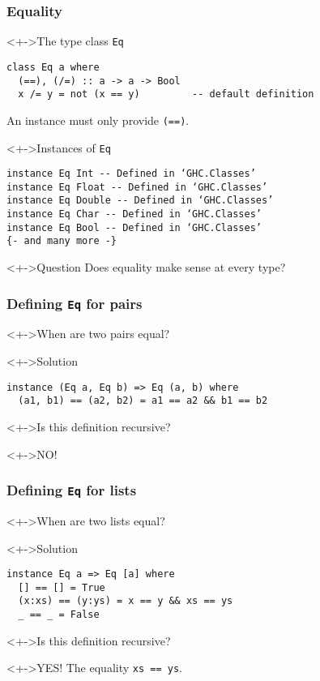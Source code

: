 \documentclass{beamer}
\begin{document}
\begin{frame}[fragile]
  \frametitle{Equality}
  \begin{block}<+->{The type class \texttt{Eq}}
\begin{verbatim}
class Eq a where
  (==), (/=) :: a -> a -> Bool
  x /= y = not (x == y)         -- default definition
\end{verbatim}
    An instance must only provide \texttt{(==)}.
  \end{block}
  \begin{block}<+->{Instances of \texttt{Eq}}
\begin{verbatim}
instance Eq Int -- Defined in ‘GHC.Classes’
instance Eq Float -- Defined in ‘GHC.Classes’
instance Eq Double -- Defined in ‘GHC.Classes’
instance Eq Char -- Defined in ‘GHC.Classes’
instance Eq Bool -- Defined in ‘GHC.Classes’
{- and many more -}
\end{verbatim}
  \end{block}
  \begin{alertblock}<+->{Question}
    Does equality make sense at every type?
  \end{alertblock}
\end{frame}
\begin{frame}[fragile]
  \frametitle{Defining \texttt{Eq} for pairs}
  \begin{block}<+->{When are two pairs equal?}
  \end{block}
  \begin{block}<+->{Solution}
\begin{verbatim}
instance (Eq a, Eq b) => Eq (a, b) where
  (a1, b1) == (a2, b2) = a1 == a2 && b1 == b2
\end{verbatim}
  \end{block}
  \begin{block}<+->{Is this definition recursive?}
  \end{block}
  \begin{alertblock}<+->{NO!}
  \end{alertblock}
\end{frame}
\begin{frame}[fragile]
  \frametitle{Defining \texttt{Eq} for lists}
  \begin{block}<+->{When are two lists equal?}
  \end{block}
  \begin{block}<+->{Solution}
\begin{verbatim}
instance Eq a => Eq [a] where
  [] == [] = True
  (x:xs) == (y:ys) = x == y && xs == ys
  _ == _ = False
\end{verbatim}
  \end{block}
  \begin{block}<+->{Is this definition recursive?}
  \end{block}
  \begin{alertblock}<+->{YES!}
    The equality \texttt{xs == ys}.
  \end{alertblock}
\end{frame}
\end{document}
